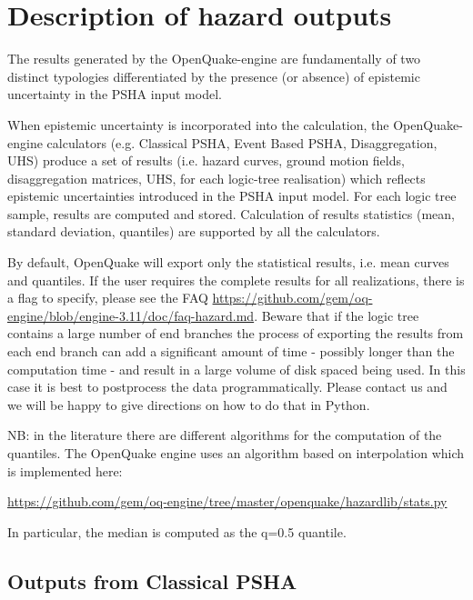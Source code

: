 \section{Description of hazard outputs}
\label{sec:hazard_outputs}

The results generated by the OpenQuake-engine are fundamentally of two
distinct typologies differentiated by the presence (or absence) of epistemic
uncertainty in the PSHA input model.

When epistemic uncertainty is incorporated into the calculation, the
OpenQuake-engine calculators (e.g. Classical PSHA, Event Based PSHA,
Disaggregation, UHS) produce a set of results (i.e. hazard curves, ground
motion fields, disaggregation matrices, UHS, for each logic-tree realisation)
which reflects epistemic uncertainties introduced in the PSHA input model.
For each logic tree sample, results are computed and stored. Calculation of
results statistics (mean, standard deviation, quantiles) are supported by all
the calculators.

By default, OpenQuake will export only the statistical results, i.e. mean
curves and quantiles. If the user requires the complete results for all
realizations, there is a flag to specify, please see the FAQ \href{https://github.com/gem/oq-engine/blob/engine-3.11/doc/faq-hazard.md}{https://github.com/gem/oq-engine/blob/engine-3.11/doc/faq-hazard.md}.
Beware that if the logic tree contains a large number of end branches the
process of exporting the results from each end branch can add a significant
amount of time - possibly longer than the computation time - and result in a
large volume of disk spaced being used. In this case it is best to postprocess
the data programmatically. Please contact us and we will be happy to give
directions on how to do that in Python.

NB: in the literature there are different algorithms for the computation
of the quantiles. The OpenQuake engine uses an algorithm based on interpolation
which is implemented here:

\href{https://github.com/gem/oq-engine/tree/master/openquake/hazardlib/stats.py}{https://github.com/gem/oq-engine/tree/master/openquake/hazardlib/stats.py}

In particular, the median is computed as the q=0.5 quantile.

\subsection{Outputs from Classical PSHA}
\label{subsec:output_classical_psha}


